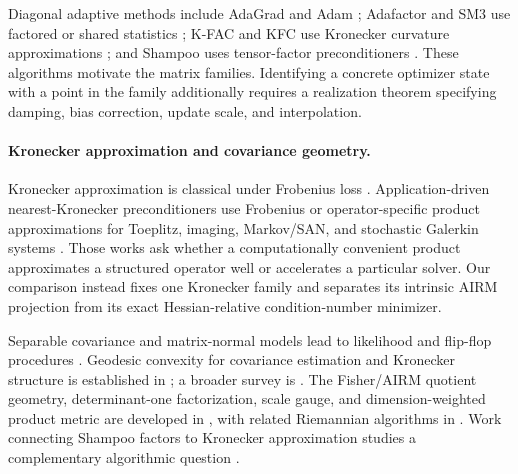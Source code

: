 Diagonal adaptive methods include AdaGrad and Adam
\cite{duchi2011adagrad,kingma2014adam}; Adafactor and SM3 use factored or
shared statistics \cite{shazeer2018adafactor,anil2019sm3}; K-FAC and KFC use
Kronecker curvature approximations \cite{martens2015kfac,grosse2016kfc};
and Shampoo uses tensor-factor preconditioners
\cite{gupta2018shampoo,anil2020scalable}.  These algorithms motivate the
matrix families.  Identifying a concrete optimizer state with a point in the
family additionally requires a realization theorem specifying damping, bias
correction, update scale, and interpolation.

\paragraph{Kronecker approximation and covariance geometry.}
Kronecker approximation is classical under Frobenius loss
\cite{vanloan1993kronecker}.  Application-driven nearest-Kronecker
preconditioners use Frobenius or operator-specific product approximations for
Toeplitz, imaging, Markov/SAN, and stochastic Galerkin systems
\cite{kamm2000optimal,nagy2006imaging,langville2004san,
langville2004testing,ullmann2010stochastic}.  Those works ask whether a
computationally convenient product approximates a structured operator well or
accelerates a particular solver.  Our comparison instead fixes one Kronecker
family and separates its intrinsic AIRM projection from its exact
Hessian-relative condition-number minimizer.

Separable covariance and matrix-normal models
lead to likelihood and flip-flop procedures
\cite{dutilleul1999mle,werner2008kronecker}.  Geodesic convexity for
covariance estimation and Kronecker structure is established in
\cite{wiesel2012geodesic,wiesel2012kroneckerconvexity}; a broader survey is
\cite{wang2022kroneckersurvey}.  The Fisher/AIRM
quotient geometry, determinant-one factorization, scale gauge, and
dimension-weighted product metric are developed in
\cite{mccormack2025kroneckergeometry}, with related Riemannian algorithms in
\cite{bouchard2021onlinekronecker,simonis2025geodesicvb}.  Work connecting
Shampoo factors to Kronecker approximation studies a complementary algorithmic
question \cite{morwani2024shampoo}.

